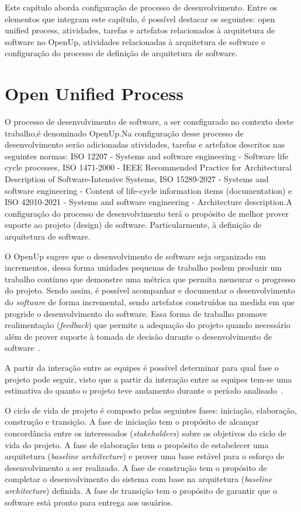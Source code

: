 Este capítulo aborda configuração de processo de desenvolvimento. Entre os elementos que integram este capítulo, é possível destacar os seguintes: open unified process, atividades, tarefas e artefatos relacionados à arquitetura de software no OpenUp, atividades relacionadas à arquitetura de software e configuração do processo de definição de arquitetura de software.

\section{Open Unified Process}

O processo de desenvolvimento de software, a ser consfigurado no contexto deste trabalho,é denominado \acrfull{OpenUp}.Na configuração desse processo de desenvolvimento serão adicionadas atividades, tarefas e artefatos descritos nas seguintes normas: ISO 12207 - Systems and software engineering - Software life cycle processes, ISO 1471-2000 - IEEE Recommended Practice for Architectural Description of Software-Intensive Systems, ISO 15289-2027 - Systems and software engineering - Content of life-cycle information items (documentation) e ISO 42010-2021 - Systems and software engineering - Architecture description.A configuração do processo de desenvolvimento terá o propósito de melhor prover suporte ao projeto (design) de software. Particularmente, à definição de arquitetura de software.


O \acrfull{OpenUp} sugere que o desenvolvimento de software seja organizado em incrementos, dessa forma unidades pequenas de trabalho podem produzir um trabalho contínuo que demonstre uma métrica que permita mensurar o progresso do projeto. Sendo assim, é possível acompanhar e documentar o desenvolvimento do \emph{software} de forma incremental, sendo artefatos construídos na medida em que progride o desenvolvimento do software. Essa forma de trabalho promove realimentação (\emph{feedback}) que permite a adequação do projeto quando necessário além de prover suporte à tomada de decisão durante o desenvolvimento de software~\cite{openup}.

A partir da interação entre as equipes é possível determinar para qual fase o projeto pode seguir, visto que a partir da interação entre as equipes tem-se uma estimativa do quanto o projeto teve andamento durante o período analisado~\cite{openup}.

%

O ciclo de vida de projeto é composto pelas seguintes fases: iniciação, elaboração, construção e transição. A fase de iniciação tem o propósito de alcançar concordância entre os interessados (\emph{stakeholders}) sobre os objetivos do ciclo de vida do projeto. A fase de elaboração tem o propósito de estabelecer uma arquitetura (\emph{baseline architecture}) e prover uma base estável para o esforço de desenvolvimento a ser realizado. A fase de construção tem o propósito de completar o desenvolvimento do sistema com base na arquitetura (\emph{baseline architecture}) definida. A fase de transição tem o propósito de garantir que o software está pronto para entrega aos usuários.

